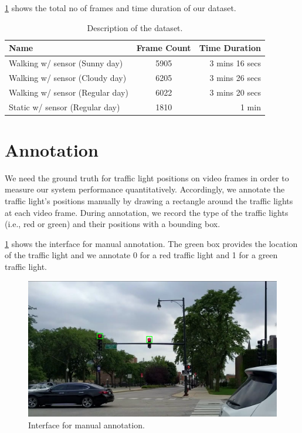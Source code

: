 \ref{t:dataset} shows the total no of frames and time duration of our dataset.

\begin{table}[h!]
  \centering
  \caption{Description of the dataset.}
  \label{t:dataset}
  \begin{tabular}{  l  c  r  }
    \rowcolor{gray!50}
    Name & Frame Count & Time Duration \\
    \hline
    Walking w/ sensor (Sunny day) & 5905 & 3 mins 16 secs  \\
    Walking w/ sensor (Cloudy day) & 6205 & 3 mins 26 secs \\
    Walking w/ sensor (Regular day) & 6022 & 3 mins 20 secs \\
    Static w/ sensor (Regular day) & 1810 & 1 min \\
    \hline
  \end{tabular}
\end{table}

\section{Annotation}
We need the ground truth for traffic light positions on video frames in order to measure our system performance quantitatively.
Accordingly, we annotate the traffic light's positions manually by drawing a rectangle around the traffic lights at each video frame.
During annotation, we record the type of the traffic lights (i.e., red or green) and their positions with a bounding box.

\ref{f:annotate} shows the interface for manual annotation.
The green box provides the location of the traffic light and we annotate 0 for a red traffic light and 1 for a green traffic light.

\begin{figure}[h!]
\centering
\includegraphics[width=5.2in]{images/annotation.png}
\caption{Interface for manual annotation.}
\label{f:annotate}
\end{figure}


